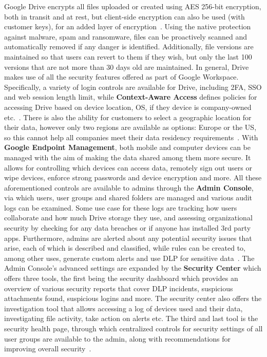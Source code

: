 Google Drive encrypts all files uploaded or created using AES 256-bit encryption, both in transit and at rest, but client-side encryption can also be used (with customer keys), for an added layer of encryption~\cite{drive_encryption,drive_client-side}. Using the native protection against malware, spam and ransomware, files can be proactively scanned and  automatically removed if any danger is identified. Additionally, file versions are maintained so that users can revert to them if they wish, but only the last 100 versions that are not more than 30 days old are maintained.  In general, Drive makes use of all the security features offered as part of Google Workspace. Specifically, a variety of login controls are available for Drive, including 2FA, SSO and web session length limit, while \textbf{Context-Aware Access} defines policies for accessing Drive based on device location, OS, if they device is company-owned etc.~\cite{drive_login_security,drive_context-aware}. There is also the ability for customers to select a geographic location for their data, however only two regions are available as options: Europe or the US, so this cannot help all companies meet their data residency requirements~\cite{drive_regions}. With \textbf{Google Endpoint Management}, both mobile and computer devices can be managed with the aim of making the data shared among them more secure. It allows for controlling which devices can access data, remotely sign out users or wipe devices, enforce strong passwords and device encryption and more. All these aforementioned controls are available to admins  through the \textbf{Admin Console}, via which users, user groups and shared folders are managed and various audit logs can be examined. Some use case for these logs are tracking how users collaborate and how much Drive storage they use, and assessing organizational security by checking for any data breaches or if anyone has installed 3rd party apps. Furthermore, admins are alerted about any potential security issues that arise, each of which is described and classified, while rules can be created to, among other uses, generate custom alerts and use DLP for sensitive data~\cite{drive_admin,drive_rules}. The Admin Console's advanced settings are expanded by the \textbf{Security Center} which offers three tools, the first being the security dashboard which provides an overview of various security reports that cover DLP incidents, suspicious attachments found, suspicious logins and more. The security center also offers the  investigation tool that allows accessing a log of devices used and their data, investigating file activity, take action on alerts etc. The third and last tool is the security health page, through which centralized controls for security settings of all user groups are available to the admin, along with recommendations for improving overall security~\cite{google_drive,drive_security_center}.

